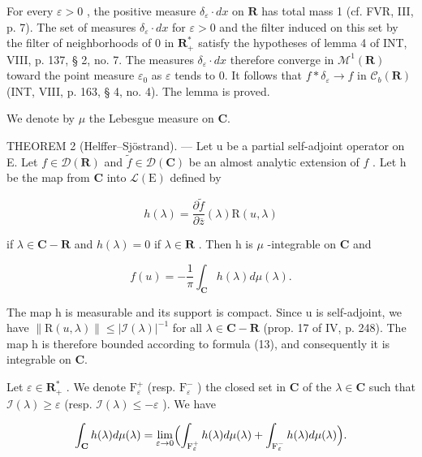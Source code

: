 For every \(\varepsilon > 0\) , the positive measure \(\delta_{\varepsilon} \cdot dx\) on \(\mathbf{R}\) has total mass 1 (cf. FVR, III, p. 7). The set of measures \(\delta_{\varepsilon} \cdot dx\) for \(\varepsilon > 0\) and the filter induced on this set by the filter of neighborhoods of 0 in \(\mathbf{R}_{+}^{*}\) satisfy the hypotheses of lemma 4 of INT, VIII, p. 137, § 2, no. 7. The measures \(\delta_{\varepsilon} \cdot dx\) therefore converge in \(\mathcal{M}^{1}(\mathbf{R})\) toward the point measure \(\varepsilon_{0}\) as \(\varepsilon\) tends to 0. It follows that \(f * \delta_{\varepsilon} \to f\) in \(\mathcal{C}_{b}(\mathbf{R})\) (INT, VIII, p. 163, § 4, no. 4). The lemma is proved.

We denote by \(\mu\) the Lebesgue measure on \(\mathbf{C}\).

THEOREM 2 (Helffer--Sjöstrand). --- Let u be a partial self-adjoint operator on E. Let \(f \in \mathcal{D}(\mathbf{R})\) and \(\widetilde{f} \in \mathcal{D}(\mathbf{C})\) be an almost analytic extension of \(f\) . Let h be the map from \(\mathbf{C}\) into \(\mathcal{L}(\mathrm{E})\) defined by

\[
h (\lambda) = \frac {\partial \widetilde {f}}{\partial \overline {{z}}} (\lambda) \mathrm{R} (u, \lambda)
\]

if \(\lambda\in\mathbf{C} - \mathbf{R}\) and \(h(\lambda)=0\) if \(\lambda\in\mathbf{R}\) . Then h is \(\mu\) -integrable on \(\mathbf{C}\) and

\[
f (u) = - \frac {1}{\pi} \int_ {\mathbf {C}} h (\lambda) d \mu (\lambda).
\]

The map h is measurable and its support is compact. Since u is self-adjoint, we have \(\|\mathrm{R}(u,\lambda)\| \leqslant |\mathcal{I}(\lambda)|^{-1}\) for all \(\lambda \in \mathbf{C} - \mathbf{R}\) (prop. 17 of IV, p. 248). The map h is therefore bounded according to formula (13), and consequently it is integrable on \(\mathbf{C}\).

Let \(\varepsilon \in \mathbf{R}_{+}^{*}\) . We denote \(\mathrm{F}_{\varepsilon}^{+}\) (resp. \(\mathrm{F}_{\varepsilon}^{-}\) ) the closed set in \(\mathbf{C}\) of the \(\lambda \in \mathbf{C}\) such that \(\mathcal{I}(\lambda) \geqslant \varepsilon\) (resp. \(\mathcal{I}(\lambda) \leqslant -\varepsilon\) ). We have

\[
\int_ {\mathbf {C}} h (\lambda) d \mu (\lambda) = \lim _ {\varepsilon \to 0} \Bigl (\int_ {\mathrm{F} _ {\varepsilon} ^ {+}} h (\lambda) d \mu (\lambda) + \int_ {\mathrm{F} _ {\varepsilon} ^ {-}} h (\lambda) d \mu (\lambda) \Bigr).
\]

